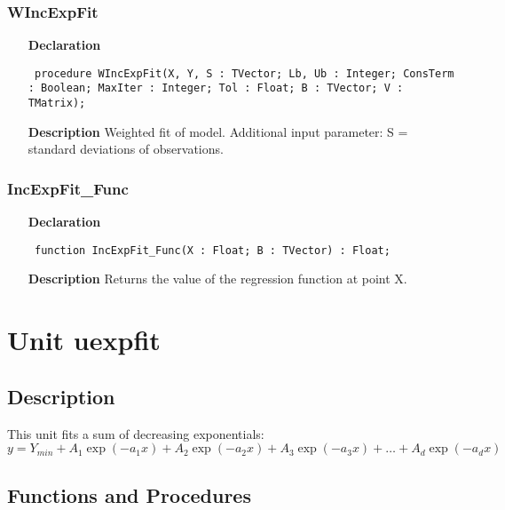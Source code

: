 \documentclass[12pt,a4paper,oneside]{report}
\newcommand{\declarationitem}[1]{\textbf{#1}}
\newcommand{\descriptiontitle}[1]{\textbf{#1}}
\newcommand{\code}[1]{\texttt{#1}}
\begin{document}
\subsubsection{WIncExpFit}
\label{uiexpfit-WIncExpFit}
\begin{itemize}\item[\declarationitem{Declaration}\hfill]
	\begin{flushleft}
		\code{
			procedure WIncExpFit(X, Y, S : TVector; Lb, Ub : Integer; ConsTerm : Boolean; MaxIter : Integer; Tol : Float; B : TVector; V : TMatrix);}
		
	\end{flushleft}
	
	\par
	\item[\descriptiontitle{Description}]
	Weighted fit of model. Additional input parameter: S = standard deviations of observations.
	
\end{itemize}
\subsubsection{IncExpFit{\_}Func}
\label{uiexpfit-IncExpFit_Func}
\begin{itemize}\item[\declarationitem{Declaration}\hfill]
	\begin{flushleft}
		\code{
			function IncExpFit{\_}Func(X : Float; B : TVector) : Float;}
		
	\end{flushleft}
	
	\par
	\item[\descriptiontitle{Description}]
	Returns the value of the regression function at point X.
	
\end{itemize}

\section{Unit uexpfit}
\label{uexpfit}
\subsection{Description}
This unit fits a sum of decreasing exponentials: 
$$y = Y_{min} + A_1 \exp(-a_1 x) + A_2 \exp(-a_2 x) + A_3 \exp(-a_3 x) + \dots+A_d \exp(-a_d x)$$ 
\subsection{Functions and Procedures}
\end{document}
